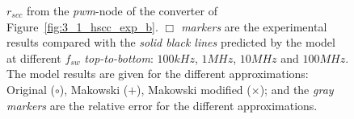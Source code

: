 \begin{figure}[!h]
\centering
    \begin{subfigure}{\textwidth}
        \parbox[c]{.03\linewidth}{\subcaption{}\label{fig:exp_rscc_pwm_node_100kHz}}
        \hspace{.02\linewidth}
        \parbox[c]{.95\linewidth}{
        \centering
        }
    \end{subfigure}

    \begin{subfigure}{\textwidth}
        \parbox[c]{.03\linewidth}{\subcaption{}\label{fig:exp_rscc_pwm_node_1MHz}}
        \hspace{.02\linewidth}
        \parbox[c]{.95\linewidth}{
        \centering
        }
    \end{subfigure}

    \begin{subfigure}{\textwidth}
        \parbox[c]{.03\linewidth}{\subcaption{}\label{fig:exp_rscc_pwm_node_10MHz}}
        \hspace{.02\linewidth}
        \parbox[c]{.95\linewidth}{
        \centering
        }
    \end{subfigure}

    \begin{subfigure}{\textwidth}
        \parbox[c]{.03\linewidth}{\subcaption{}\label{fig:exp_rscc_pwm_node_100MHz}}
        \hspace{.02\linewidth}
        \parbox[c]{.95\linewidth}{
        \centering
        }
    \end{subfigure}

\caption{$r_{scc}$ from the \emph{pwm}-node of the converter of Figure~\ref{fig:3_1_hscc_exp_b}. \emph{$\Box$ markers} are the experimental results compared with the \emph{solid black lines} predicted by the model at different $f_{sw}$ \emph{top-to-bottom}: $100kHz$, $1MHz$, $10MHz$ and $100MHz$. The model results are given for the different approximations: Original ($\circ$), Makowski ($+$), Makowski modified ($\times$); and the \emph{gray markers} are the relative error for the different approximations.  }
\label{fig:exp_rscc_pwm_node_dx}
\end{figure}

